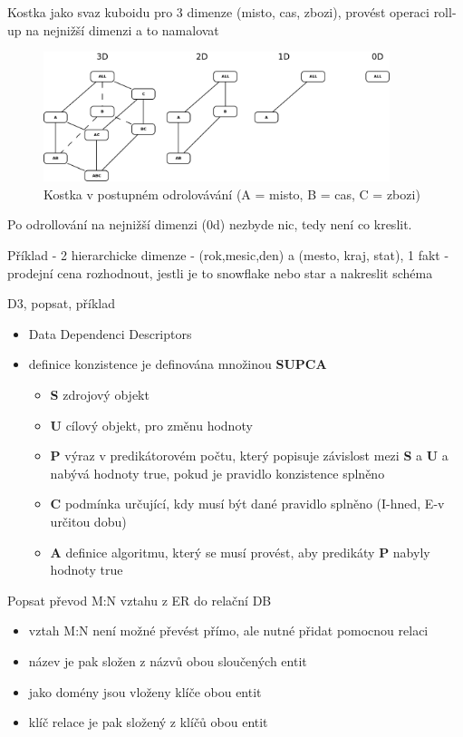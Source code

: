 \documentclass[12pt,a4paper,titlepage,final]{article}
\begin{document}
\begin{enumerate}
   	{\large \item Kostka jako svaz kuboidu pro 3 dimenze (misto, cas, zbozi), provést operaci roll-up na nejnižší dimenzi a to namalovat}
   	\begin{figure}[h!]
   		\centering
   		\includegraphics[width=0.9\textwidth]{kostky.png}
   		\caption{Kostka v postupném odrolovávání (A = misto, B = cas, C = zbozi)}
   	\end{figure}
   	
   	Po odrollování na nejnižší dimenzi (0d) nezbyde nic, tedy není co kreslit.
	
	{\large \item Příklad - 2 hierarchicke dimenze - (rok,mesic,den) a (mesto, kraj, stat), 1 fakt - prodejní cena rozhodnout, jestli je to snowflake nebo star a nakreslit schéma }
	
	{\large \item D3, popsat, příklad}
	\begin{itemize}
		\item Data Dependenci Descriptors
		\item definice konzistence je definována množinou \textbf{SUPCA}
		\begin{itemize}
			\item \textbf{S} zdrojový objekt
			\item \textbf{U} cílový objekt, pro změnu hodnoty
			\item \textbf{P} výraz v predikátorovém počtu, který popisuje závislost mezi \textbf{S} a \textbf{U} a nabývá hodnoty true, pokud je pravidlo konzistence splněno
			\item \textbf{C} podmínka určující, kdy musí být dané pravidlo splněno (I-hned, E-v určitou dobu)
			\item \textbf{A} definice algoritmu, který se musí provést, aby predikáty \textbf{P} nabyly hodnoty true	
		\end{itemize}
	\end{itemize}
	
	
	{\large \item Popsat převod M:N vztahu z ER do relační DB}
	\begin{itemize}
		\item vztah M:N není možné převést přímo, ale nutné přidat pomocnou relaci
		\item název je pak složen z názvů obou sloučených entit
		\item jako domény jsou vloženy klíče obou entit
		\item klíč relace je pak složený z klíčů obou entit
	\end{itemize}
	

\end{enumerate}
\end{document}
